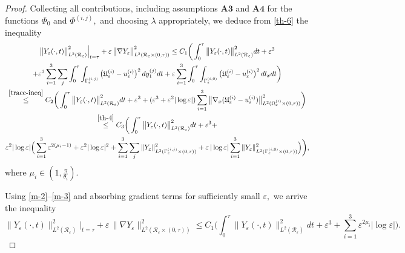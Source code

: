 \documentclass[reqno]{amsart}            %
\numberwithin{equation}{section}
\begin{document}
\begin{proof}
		Collecting all contributions, including assumptions $\mathbf{A3}$ and $\mathbf{A4}$ for the functions $\Phi_0$ and $\Phi^{(i,j)},$ and choosing $\lambda$ appropriately, we deduce from \eqref{th-6} the inequality    
		\begin{multline}\label{th-8}
			\big\|Y_\varepsilon(\cdot,t)\big\|^2_{L^2(\mathcal{R}_\varepsilon)}\Big|_{t=\tau}
			+ \varepsilon \, \big\| {\nabla Y_\varepsilon}\big\|^2_{L^2(\mathcal{R}_\varepsilon\times (0, \tau))} \le C_1 \bigg(\int_{0}^{\tau} \big\|Y_\varepsilon(\cdot,t)\big\|^2_{L^2(\mathcal{R}_\varepsilon)} dt + \varepsilon^3
			\\
			+
			\varepsilon^3 \sum_{i=1}^{3} \sum_j\int_{0}^{\tau}\int_{\Gamma^{(i,j)}_\varepsilon}
			\big(\mathfrak{U}^{(i)}_\varepsilon - u^{(i)}_\varepsilon\big)^2\, d y_1^{(j)}dt
			+  \varepsilon \sum_{i=1}^{3}\int_{0}^{\tau}\int_{\Gamma^{(i,0)}_\varepsilon}\big(\mathfrak{U}^{(i)}_\varepsilon - u^{(i)}_\varepsilon\big)^2\, dl_xdt\bigg)
			\\
			\stackrel{\eqref{trace-ineq}}{\le}
			C_2 \bigg(\int_{0}^{\tau} \big\|Y_\varepsilon(\cdot,t)\big\|^2_{L^2(\mathcal{R}_\varepsilon)} dt + \varepsilon^3
			+
			(\varepsilon^3 + \varepsilon^2 |\log\varepsilon|) \sum_{i=1}^{3} \big\|\nabla_x(\mathfrak{U}^{(i)}_\varepsilon - u^{(i)}_\varepsilon)\big\|^2_{L^2(\Omega_\varepsilon^{(i)}\times(0,\tau))}\bigg)
			\\
			\stackrel{\eqref{th-4}}{\le}
			C_3 \bigg(\int_{0}^{\tau} \big\|Y_\varepsilon(\cdot,t)\big\|^2_{L^2(\mathcal{R}_\varepsilon)} dt + \varepsilon^3
			+
			\\
			\varepsilon^2 |\log\varepsilon| \Big(
			\sum_{i=1}^{3}\varepsilon^{2(\mu_i -1)} + 
			\varepsilon^2 |\log\varepsilon|^2 
			+ \sum_{i=1}^{3}\sum_{j} \|Y_\varepsilon\|^2_{L^2(\Gamma_\varepsilon^{(i,j)}\times (0,\tau))} + \varepsilon \, |\log\varepsilon| \sum_{i=1}^{3}\|Y_\varepsilon\|^2_{L^2(\Gamma_\varepsilon^{(i,0)}\times (0,\tau))}
			\Big)\bigg),
		\end{multline}
		where $\mu_i \in (1, \tfrac{\pi}{\theta_i}).$
		
		
		Using \eqref{m-2}--\eqref{m-3} and absorbing gradient terms for  sufficiently small $\varepsilon,$ we arrive  the inequality
		\begin{equation}\label{th-9}
			\big\|Y_\varepsilon(\cdot,t)\big\|^2_{L^2(\mathcal{R}_\varepsilon)}\Big|_{t=\tau}
			+ \varepsilon \, \big\| {\nabla Y_\varepsilon}\big\|^2_{L^2(\mathcal{R}_\varepsilon\times (0, \tau))} \le C_1 \bigg(\int_{0}^{\tau} \big\|Y_\varepsilon(\cdot,t)\big\|^2_{L^2(\mathcal{R}_\varepsilon)} dt + \varepsilon^3 + \sum_{i=1}^{3}\varepsilon^{2 \mu_i} |\log\varepsilon| \bigg). 	
		\end{equation}
		

\end{proof}
\end{document}
